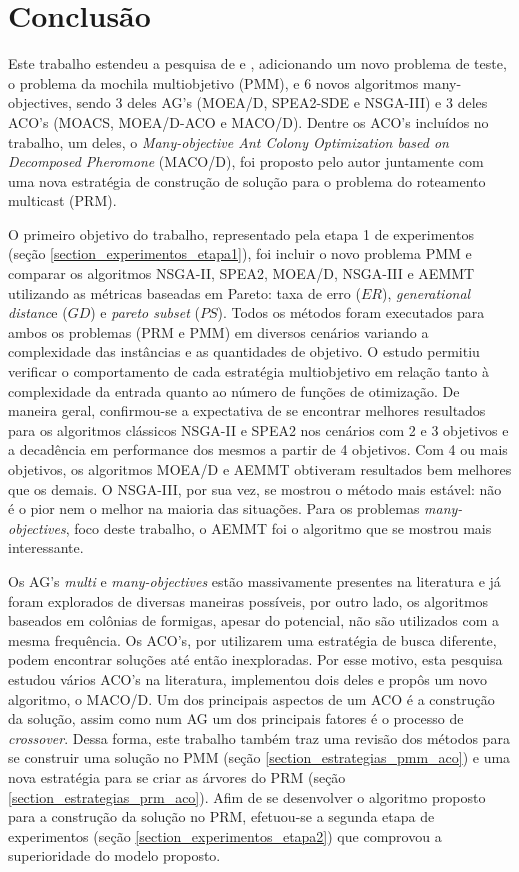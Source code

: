 \chapter[Conclusão]{Conclusão}
Este trabalho estendeu a pesquisa de \cite{Bueno2010} e \cite{Lafeta2016}, adicionando um novo problema de teste, o problema da mochila multiobjetivo (PMM), e 6 novos algoritmos many-objectives, sendo 3 deles AG's (MOEA/D, SPEA2-SDE e NSGA-III) e 3 deles ACO's (MOACS, MOEA/D-ACO e MACO/D). Dentre os ACO's incluídos no trabalho, um deles, o \textit{Many-objective Ant Colony Optimization based on Decomposed Pheromone} (MACO/D), foi proposto pelo autor juntamente com uma nova estratégia de construção de solução para o problema do roteamento multicast (PRM).

O primeiro objetivo do trabalho, representado pela etapa 1 de experimentos (seção \ref{section_experimentos_etapa1}), foi incluir o novo problema PMM e comparar os algoritmos NSGA-II, SPEA2, MOEA/D, NSGA-III e AEMMT utilizando as métricas baseadas em Pareto: taxa de erro ($ER$), \textit{generational distanc}e ($GD$) e \textit{pareto subset} ($PS$). Todos os métodos foram executados para ambos os problemas (PRM e PMM) em diversos cenários variando a complexidade das instâncias e as quantidades de objetivo. O estudo permitiu verificar o comportamento de cada estratégia multiobjetivo em relação tanto à complexidade da entrada quanto ao número de funções de otimização. De maneira geral, confirmou-se a expectativa de se encontrar melhores resultados para os algoritmos clássicos NSGA-II e SPEA2 nos cenários com 2 e 3 objetivos e a decadência em performance dos mesmos a partir de 4 objetivos. Com 4 ou mais objetivos, os algoritmos MOEA/D e AEMMT obtiveram resultados bem melhores que os demais. O NSGA-III, por sua vez, se mostrou o método mais estável: não é o pior nem o melhor na maioria das situações. Para os problemas \textit{many-objectives}, foco deste trabalho, o AEMMT foi o algoritmo que se mostrou mais interessante.

Os AG's \textit{multi} e \textit{many-objectives} estão massivamente presentes na literatura e já foram explorados de diversas maneiras possíveis, por outro lado, os algoritmos baseados em colônias de formigas, apesar do potencial, não são utilizados com a mesma frequência. Os ACO's, por utilizarem uma estratégia de busca diferente, podem encontrar soluções até então inexploradas. Por esse motivo, esta pesquisa estudou vários ACO's na literatura, implementou dois deles e propôs um novo algoritmo, o MACO/D. Um dos principais aspectos de um ACO é a construção da solução, assim como num AG um dos principais fatores é o processo de \textit{crossover}. Dessa forma, este trabalho também traz uma revisão dos métodos para se construir uma solução no PMM (seção \ref{section_estrategias_pmm_aco}) e uma nova estratégia para se criar as árvores do PRM (seção \ref{section_estrategias_prm_aco}). Afim de se desenvolver o algoritmo proposto para a construção da solução no PRM, efetuou-se a segunda etapa de experimentos (seção \ref{section_experimentos_etapa2}) que comprovou a superioridade do modelo proposto.

